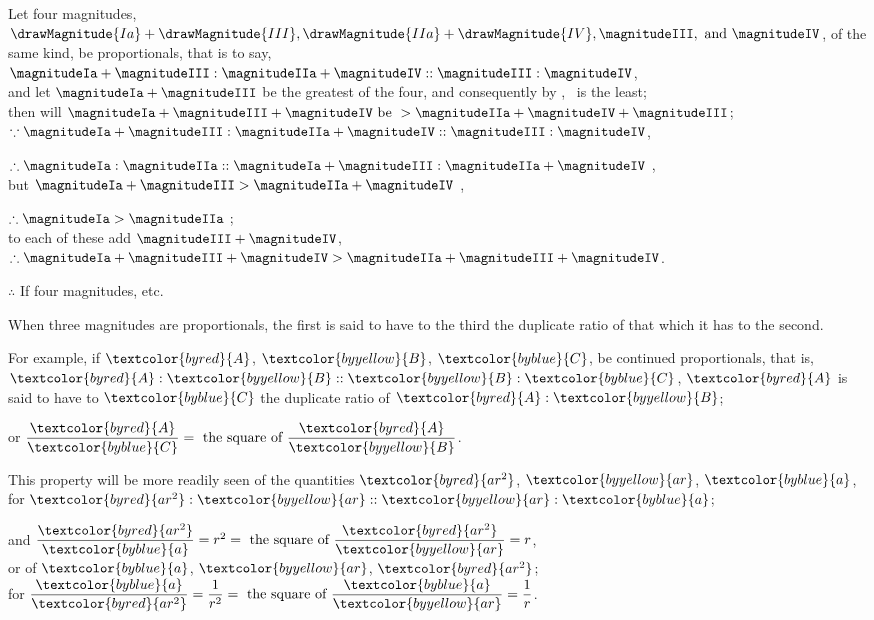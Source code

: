 \documentclass[booklanguage=english]{byrnebook}
\begin{document}
\begin{center}
Let four magnitudes, $\drawMagnitude{Ia} + \drawMagnitude{III}, \drawMagnitude{IIa} + \drawMagnitude{IV}, \magnitudeIII, \mbox{ and } \magnitudeIV$, of the same kind, be proportionals, that is to say,\\
$\magnitudeIa + \magnitudeIII : \magnitudeIIa + \magnitudeIV :: \magnitudeIII : \magnitudeIV$,\\
and let $\magnitudeIa + \magnitudeIII$ be the greatest of the four, and consequently by , \magnitudeIV\ is the least;\\
then will $\magnitudeIa + \magnitudeIII + \magnitudeIV \mbox{ be } > \magnitudeIIa + \magnitudeIV + \magnitudeIII$;\\
$\because \magnitudeIa + \magnitudeIII : \magnitudeIIa + \magnitudeIV :: \magnitudeIII : \magnitudeIV$, %

$\therefore \magnitudeIa : \magnitudeIIa :: \magnitudeIa + \magnitudeIII : \magnitudeIIa + \magnitudeIV$ ,\\
but $\magnitudeIa + \magnitudeIII > \magnitudeIIa + \magnitudeIV$ \byref{\hypref},

$\therefore \magnitudeIa > \magnitudeIIa$ ;\\
to each of these add $\magnitudeIII + \magnitudeIV$,\\
$\therefore \magnitudeIa + \magnitudeIII + \magnitudeIV > \magnitudeIIa + \magnitudeIII + \magnitudeIV$.

$\therefore$ If four magnitudes, etc.
\end{center}

\vfill\pagebreak

\label{def:V.X} 
\def\varA{\textcolor{byred}{A}}
\def\varB{\textcolor{byyellow}{B}}
\def\varC{\textcolor{byblue}{C}}
\def\vararS{\textcolor{byred}{ar^2}}
\def\varar{\textcolor{byyellow}{ar}}
\def\vara{\textcolor{byblue}{a}}
When three magnitudes are proportionals, the first is said to have to the third the duplicate ratio of that which it has to the second.

For example, if $\varA$, $\varB$, $\varC$, be continued proportionals, that is, $\varA : \varB :: \varB : \varC$, $\varA$ is said to have to $\varC$ the duplicate ratio of $\varA : \varB$;

\begin{center}
or $\dfrac{\varA}{\varC} = \mbox{ the square of } \dfrac{\varA}{\varB}$.

This property will be more readily seen of the quantities $\vararS$, $\varar$, $\vara$, for $\vararS : \varar :: \varar : \vara$;

and $\dfrac{\vararS}{\vara} = r^2 = \mbox{ the square of } \dfrac{\vararS}{\varar} = r$,\\
or of $\vara$, $\varar$, $\vararS$;\\
for $\dfrac{\vara}{\vararS} = \dfrac{1}{r^2} = \mbox{ the square of } \dfrac{\vara}{\varar} = \dfrac{1}{r}$.
\end{center}
\end{document}
